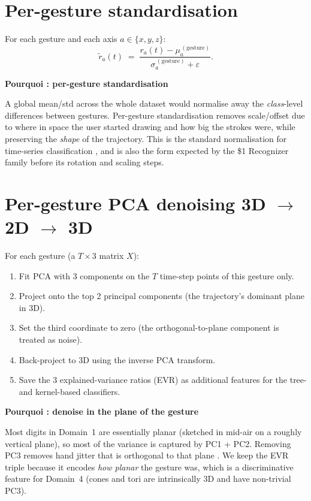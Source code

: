 \documentclass[11pt,a4paper]{article}
\newenvironment{whybox}[1]{%
    \begin{shaded*}\noindent\textbf{Pourquoi : #1}\par\vspace{0.3em}}
    {\end{shaded*}}
\renewenvironment{shaded*}
    {\definecolor{shadecolor}{named}{whyboxbg}\begin{shaded}}
    {\end{shaded}}
\begin{document}
\section{Per-gesture standardisation}

For each gesture and each axis $a\in\{x,y,z\}$:
\[
    \tilde{r}_a(t) \;=\; \frac{r_a(t) - \mu_a^{\,(\text{gesture})}}
                              {\sigma_a^{\,(\text{gesture})}+\varepsilon}.
\]

\begin{whybox}{per-gesture standardisation}
A global mean/std across the whole dataset would normalise away the
\emph{class}-level differences between gestures. Per-gesture
standardisation removes scale/offset due to where in space the user
started drawing and how big the strokes were, while preserving the
\emph{shape} of the trajectory. This is the standard normalisation
for time-series classification \cite{theodoridis2009pattern}, and is
also the form expected by the \$1 Recognizer family before its rotation
and scaling steps.
\end{whybox}

\section{Per-gesture PCA denoising 3D $\to$ 2D $\to$ 3D}

For each gesture (a $T\times 3$ matrix $X$):
\begin{enumerate}[itemsep=0.2em,topsep=0.2em]
    \item Fit PCA with 3 components on the $T$ time-step points of this
          gesture only.
    \item Project onto the top 2 principal components (the trajectory's
          dominant plane in 3D).
    \item Set the third coordinate to zero (the orthogonal-to-plane
          component is treated as noise).
    \item Back-project to 3D using the inverse PCA transform.
    \item Save the 3 explained-variance ratios (EVR) as additional
          features for the tree- and kernel-based classifiers.
\end{enumerate}

\begin{whybox}{denoise in the plane of the gesture}
Most digits in Domain~1 are essentially planar (sketched in mid-air
on a roughly vertical plane), so most of the variance is captured by
PC1 + PC2. Removing PC3 removes hand jitter that is orthogonal to
that plane \cite{jolliffe2002pca}. We keep the EVR triple because it
encodes \emph{how planar} the gesture was, which is a discriminative
feature for Domain~4 (cones and tori are intrinsically 3D and have
non-trivial PC3).
\end{whybox}
\end{document}
